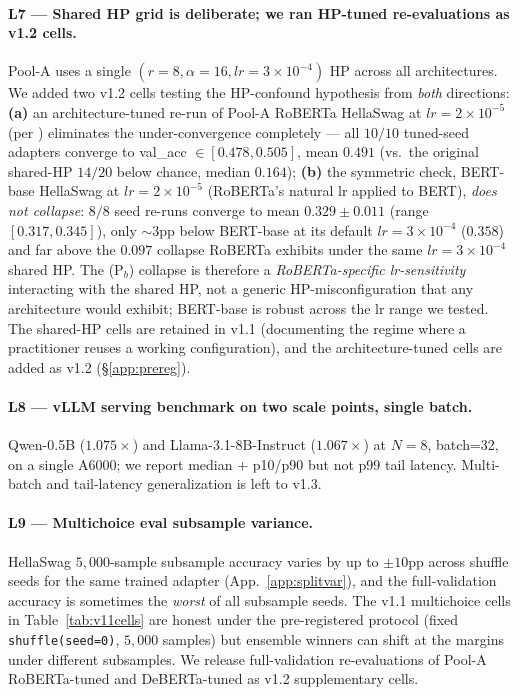 \documentclass[11pt]{article}
\begin{document}
\paragraph{L7 — Shared HP grid is deliberate; we ran HP-tuned re-evaluations as v1.2 cells.} Pool-A uses a single $(r{=}8, \alpha{=}16, lr{=}3{\times}10^{-4})$ HP across all architectures. We added two v1.2 cells testing the HP-confound hypothesis from \emph{both} directions: \textbf{(a)} an architecture-tuned re-run of Pool-A RoBERTa HellaSwag at $lr{=}2{\times}10^{-5}$ (per \citealp{liu2019roberta}) eliminates the under-convergence completely --- all $10/10$ tuned-seed adapters converge to val\_acc $\in [0.478, 0.505]$, mean $0.491$ (vs.\ the original shared-HP $14/20$ below chance, median $0.164$); \textbf{(b)} the symmetric check, BERT-base HellaSwag at $lr{=}2{\times}10^{-5}$ (RoBERTa's natural lr applied to BERT), \emph{does not collapse}: $8/8$ seed re-runs converge to mean $0.329 \pm 0.011$ (range $[0.317, 0.345]$), only $\sim 3$pp below BERT-base at its default $lr{=}3{\times}10^{-4}$ ($0.358$) and far above the $0.097$ collapse RoBERTa exhibits under the same $lr{=}3{\times}10^{-4}$ shared HP. The (P$_b$) collapse is therefore a \emph{RoBERTa-specific lr-sensitivity} interacting with the shared HP, not a generic HP-misconfiguration that any architecture would exhibit; BERT-base is robust across the lr range we tested. The shared-HP cells are retained in v1.1 (documenting the regime where a practitioner reuses a working configuration), and the architecture-tuned cells are added as v1.2 (\S\ref{app:prereg}).

\paragraph{L8 — vLLM serving benchmark on two scale points, single batch.} Qwen-0.5B ($1.075{\times}$) and Llama-3.1-8B-Instruct ($1.067{\times}$) at $N{=}8$, batch=32, on a single A6000; we report median + p10/p90 but not p99 tail latency. Multi-batch and tail-latency generalization is left to v1.3.

\paragraph{L9 — Multichoice eval subsample variance.} HellaSwag $5{,}000$-sample subsample accuracy varies by up to $\pm 10$pp across shuffle seeds for the same trained adapter (App.~\ref{app:splitvar}), and the full-validation accuracy is sometimes the \emph{worst} of all subsample seeds. The v1.1 multichoice cells in Table~\ref{tab:v11cells} are honest under the pre-registered protocol (fixed \texttt{shuffle(seed=0)}, $5{,}000$ samples) but ensemble winners can shift at the margins under different subsamples. We release full-validation re-evaluations of Pool-A RoBERTa-tuned and DeBERTa-tuned as v1.2 supplementary cells.
\end{document}
